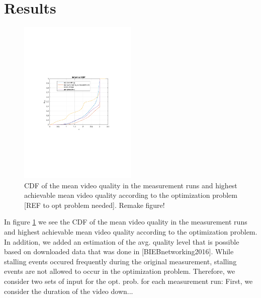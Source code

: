 
\section{Results}
\label{sec:results}


\begin{figure}[t]
\centering
\includegraphics[width=0.5\textwidth]{figs/quality}%
\caption{CDF of the mean video quality in the measurement runs and highest achievable mean video quality according to the optimization problem [REF to opt problem needed]. Remake figure!}
\label{fig:opt}%
\end{figure}


In figure \ref{fig:opt} we see the CDF of the mean video quality in the measurement runs and highest achievable mean video quality according to the optimization problem. In addition, we added an estimation of the avg. quality level that is possible based on downloaded data that was done in [BIEBnetworking2016]. While stalling events occured frequently during the original measurement, stalling events are not allowed to occur in the optimization problem. Therefore, we consider two sets of input for the opt. prob. for each measurement run: First, we consider the duration of the video down...